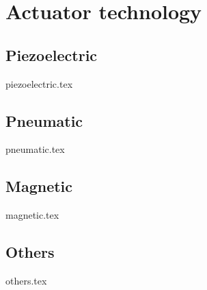 \section{Actuator technology}
        \subsection{Piezoelectric}
        {piezoelectric.tex}
        
        \subsection{Pneumatic}
        {pneumatic.tex}

        \subsection{Magnetic}
        {magnetic.tex}

        \subsection{Others}
        {others.tex}